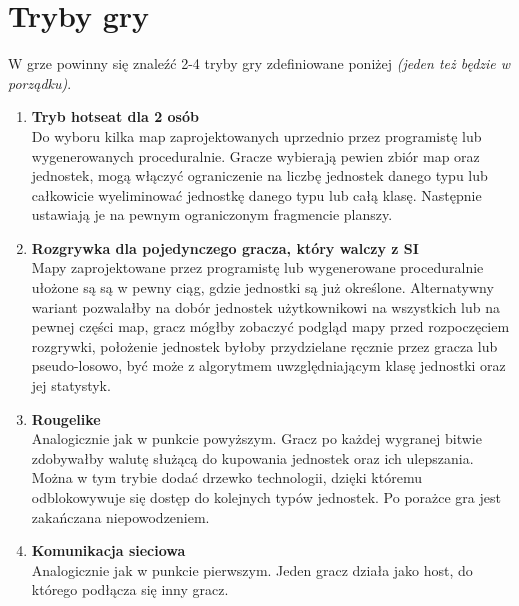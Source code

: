 \documentclass[oneside]{lmdEN}%
\begin{document}
  
  
%  
\begin{topmatter}  
 \title{\lmdtitle}%
 \author{Piotr Kuchta\sep Mateusz Knap\and Jakub Szaredko}%
\end{topmatter} 

%  

\section{Tryby gry}

W grze powinny się znaleźć 2-4 tryby gry zdefiniowane poniżej \textit{(jeden też będzie w porządku)}.
\begin{enumerate}
    \item \textbf{Tryb hotseat dla 2 osób} \\
          Do wyboru kilka map zaprojektowanych uprzednio przez
          programistę lub wygenerowanych proceduralnie. Gracze
          wybierają pewien zbiór map oraz jednostek, mogą włączyć ograniczenie na liczbę jednostek danego typu lub całkowicie wyeliminować jednostkę danego typu lub całą klasę. Następnie ustawiają je na pewnym ograniczonym fragmencie planszy.
    \item \textbf{Rozgrywka dla pojedynczego gracza, który walczy z SI} \\
          Mapy zaprojektowane przez programistę lub wygenerowane proceduralnie ułożone są są w pewny ciąg, gdzie jednostki są już określone. Alternatywny wariant pozwalałby na dobór jednostek użytkownikowi na wszystkich lub na pewnej części map, gracz mógłby zobaczyć podgląd mapy przed rozpoczęciem rozgrywki, położenie jednostek byłoby przydzielane ręcznie przez gracza lub pseudo-losowo, być może z algorytmem uwzględniającym klasę jednostki oraz jej statystyk.
    \item \textbf{Rougelike} \\
          Analogicznie jak w punkcie powyższym. Gracz po każdej wygranej bitwie zdobywałby walutę służącą do kupowania jednostek oraz ich ulepszania. Można w tym trybie dodać drzewko technologii, dzięki któremu odblokowywuje się dostęp do kolejnych typów jednostek. Po porażce gra jest zakańczana niepowodzeniem.
    \item \textbf{Komunikacja sieciowa} \\
          Analogicznie jak w punkcie pierwszym. Jeden gracz działa jako host, do którego podłącza się inny gracz.
\end{enumerate}
\end{document}

